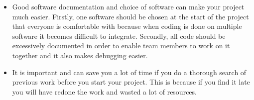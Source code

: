 \begin{itemize}
  \item Good software documentation and choice of software can make your project much easier. Firstly, one software should be chosen at the start of the project that everyone is comfortable with because when coding is done on multiple software it becomes difficult to integrate. Secondly, all code should be excessively documented in order to enable team members to work on it together and it also makes debugging easier.

  \item It is important and can save you a lot of time if you do a thorough search of previous work before you start your project. This is because if you find it late you will have redone the work and wasted a lot of resources.

\end{itemize}
